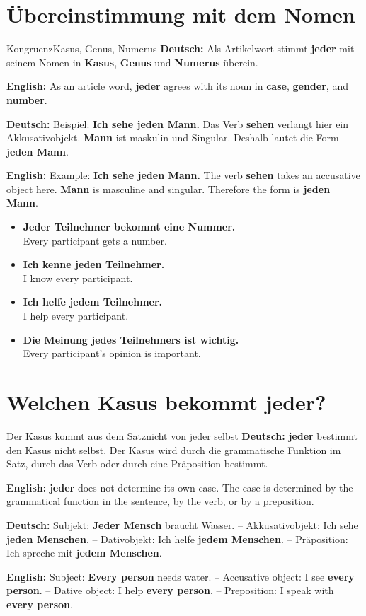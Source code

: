 \documentclass[a4paper,11pt]{article}
\newcommand{\GermanText}[1]{\textbf{Deutsch: }#1\par}
\newcommand{\EnglishText}[1]{{\small\color{SoftGray}\textbf{English: }#1\par}}
\newcommand{\ExampleItem}[2]{\item \textbf{#1}\\{\small\color{SoftGray}#2}}
\begin{document}
\section{Übereinstimmung mit dem Nomen}
\begin{grammarentry}{Kongruenz}{Kasus, Genus, Numerus}
\GermanText{Als Artikelwort stimmt \textbf{jeder} mit seinem Nomen in \textbf{Kasus}, \textbf{Genus} und \textbf{Numerus} überein.}
\EnglishText{As an article word, \textbf{jeder} agrees with its noun in \textbf{case}, \textbf{gender}, and \textbf{number}.}
\GermanText{Beispiel: \textbf{Ich sehe jeden Mann.} Das Verb \textbf{sehen} verlangt hier ein Akkusativobjekt. \textbf{Mann} ist maskulin und Singular. Deshalb lautet die Form \textbf{jeden Mann}.}
\EnglishText{Example: \textbf{Ich sehe jeden Mann.} The verb \textbf{sehen} takes an accusative object here. \textbf{Mann} is masculine and singular. Therefore the form is \textbf{jeden Mann}.}
\end{grammarentry}

\begin{exbox}
\begin{itemize}
\ExampleItem{Jeder Teilnehmer bekommt eine Nummer.}{Every participant gets a number.}
\ExampleItem{Ich kenne jeden Teilnehmer.}{I know every participant.}
\ExampleItem{Ich helfe jedem Teilnehmer.}{I help every participant.}
\ExampleItem{Die Meinung jedes Teilnehmers ist wichtig.}{Every participant's opinion is important.}
\end{itemize}
\end{exbox}

\section{Welchen Kasus bekommt jeder?}
\begin{grammarentry}{Der Kasus kommt aus dem Satz}{nicht von jeder selbst}
\GermanText{\textbf{jeder} bestimmt den Kasus nicht selbst. Der Kasus wird durch die grammatische Funktion im Satz, durch das Verb oder durch eine Präposition bestimmt.}
\EnglishText{\textbf{jeder} does not determine its own case. The case is determined by the grammatical function in the sentence, by the verb, or by a preposition.}
\GermanText{Subjekt: \textbf{Jeder Mensch} braucht Wasser. -- Akkusativobjekt: Ich sehe \textbf{jeden Menschen}. -- Dativobjekt: Ich helfe \textbf{jedem Menschen}. -- Präposition: Ich spreche mit \textbf{jedem Menschen}.}
\EnglishText{Subject: \textbf{Every person} needs water. -- Accusative object: I see \textbf{every person}. -- Dative object: I help \textbf{every person}. -- Preposition: I speak with \textbf{every person}.}
\end{grammarentry}
\end{document}
